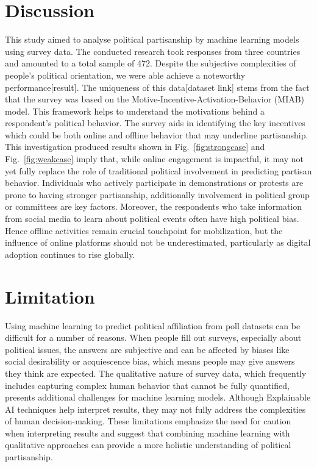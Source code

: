 \documentclass[pt]{article}  %
\begin{document}
\section{Discussion}
This study aimed to analyse political partisanship by machine learning models using survey data. The conducted research took responses from three countries and amounted to a total sample of 472. Despite the subjective complexities of people’s political orientation, we were able achieve a noteworthy performance[result].  The uniqueness of this data[dataset link] stems from the fact that the survey was based on the Motive-Incentive-Activation-Behavior (MIAB) model\cite{ref5}.  This framework helps to understand the motivations behind a respondent’s political behavior. The survey aids in identifying the key incentives which could be both online and offline behavior that may underline partisanship. This investigation produced results shown in Fig.~\ref{fig:strongcase} and Fig.~\ref{fig:weakcase} imply that, while online engagement is impactful, it may not yet fully replace the role of traditional political involvement in predicting partisan behavior. Individuals who actively participate in demonstrations or protests are prone to having stronger partisanship, additionally involvement in political group or committees are key factors. Moreover, the respondents who take information from social media to learn about political events often have high political bias. Hence offline activities remain crucial touchpoint for mobilization, but the influence of online platforms should not be underestimated, particularly as digital adoption continues to rise globally. 


\section{Limitation}

Using machine learning to predict political affiliation from poll datasets can be difficult for a number of reasons. When people fill out surveys, especially about political issues, the answers are subjective and can be affected by biases like social desirability or acquiescence bias, which means people may give answers they think are expected. The qualitative nature of survey data, which frequently includes capturing complex human behavior that cannot be fully quantified, presents additional challenges for machine learning models. Although Explainable AI techniques help interpret results, they may not fully address the complexities of human decision-making. These limitations emphasize the need for caution when interpreting results and suggest that combining machine learning with qualitative approaches can provide a more holistic understanding of political partisanship.
\end{document}
